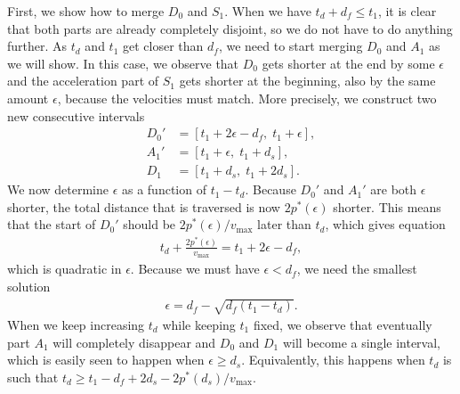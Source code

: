 \documentclass[a4paper]{article}
\theoremstyle{definition}
\theoremstyle{plain}
\begin{document}
First, we show how to merge $D_{0}$ and $S_{1}$.
When we have $t_{d} + d_{f} \leq t_{1}$, it is clear that both parts are already
completely disjoint, so we do not have to do anything further.
As $t_{d}$ and $t_{1}$ get closer than $d_{f}$, we need to start merging $D_{0}$
and $A_{1}$ as we will show. In this case, we observe that $D_{0}$ gets shorter
at the end by some $\epsilon$ and the acceleration part of $S_{1}$ gets shorter at the
beginning, also by the same amount $\epsilon$, because the velocities must match. More
precisely, we construct two new consecutive intervals
\begin{align*}
  D_{0}' &= [t_{1} + 2 \epsilon - d_{f}, \; t_{1} + \epsilon] , \\
  A_{1}' &= [t_{1} + \epsilon,   \; t_{1} + d_{s}],  \\
  D_{1}  &= [t_{1} + d_{s},      \; t_{1} + 2 d_{s}] .
\end{align*}
%
We now determine $\epsilon$ as a function of $t_{1} - t_{d}$.
%
Because $D_{0}'$ and $A_{1}'$ are both $\epsilon$ shorter, the total distance
that is traversed is now $2 p^{*}(\epsilon)$ shorter. This means that the start
of $D_{0}'$ should be $2 p^{*}(\epsilon) / v_{\max}$ later than $t_{d}$, which
gives equation
\begin{align*}
  t_{d} + \frac{2 p^{*}(\epsilon)}{v_{\max}}  = t_{1} + 2\epsilon - d_{f} ,
\end{align*}
which is quadratic in $\epsilon$. Because we must have $\epsilon < d_{f}$, we need the
smallest solution
\begin{align*}
  \epsilon = d_{f} - \sqrt{d_{f} (t_{1} - t_{d})} .
\end{align*}
When we keep increasing $t_{d}$ while keeping $t_{1}$ fixed, we observe that
eventually part $A_{1}$ will completely disappear and $D_{0}$ and $D_{1}$ will
become a single interval, which is easily seen to happen when $\epsilon \geq d_{s}$.
Equivalently, this happens when $t_{d}$ is such that
$t_{d} \geq t_{1} - d_{f} + 2 d_{s} - 2p^{*}(d_{s}) / v_{\max}$.
\end{document}
